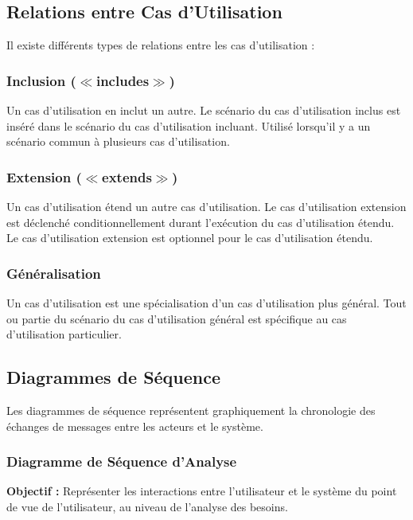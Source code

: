 \documentclass{article}
\begin{document}
\begin{itemize}
\subsection{Relations entre Cas d'Utilisation}

Il existe différents types de relations entre les cas d'utilisation :

\subsubsection{Inclusion ($\ll$includes$\gg$)}

Un cas d'utilisation en inclut un autre. Le scénario du cas d'utilisation inclus est inséré dans le scénario du cas d'utilisation incluant. Utilisé lorsqu'il y a un scénario commun à plusieurs cas d'utilisation.

\subsubsection{Extension ($\ll$extends$\gg$)}

Un cas d'utilisation étend un autre cas d'utilisation. Le cas d'utilisation extension est déclenché conditionnellement durant l'exécution du cas d'utilisation étendu. Le cas d'utilisation extension est optionnel pour le cas d'utilisation étendu.

\subsubsection{Généralisation}

Un cas d'utilisation est une spécialisation d'un cas d'utilisation plus général. Tout ou partie du scénario du cas d'utilisation général est spécifique au cas d'utilisation particulier.

\subsection{Diagrammes de Séquence}

Les diagrammes de séquence représentent graphiquement la chronologie des échanges de messages entre les acteurs et le système.

\subsubsection{Diagramme de Séquence d'Analyse}

\textbf{Objectif :} Représenter les interactions entre l'utilisateur et le système du point de vue de l'utilisateur, au niveau de l'analyse des besoins.


\end{itemize}
\end{document}
